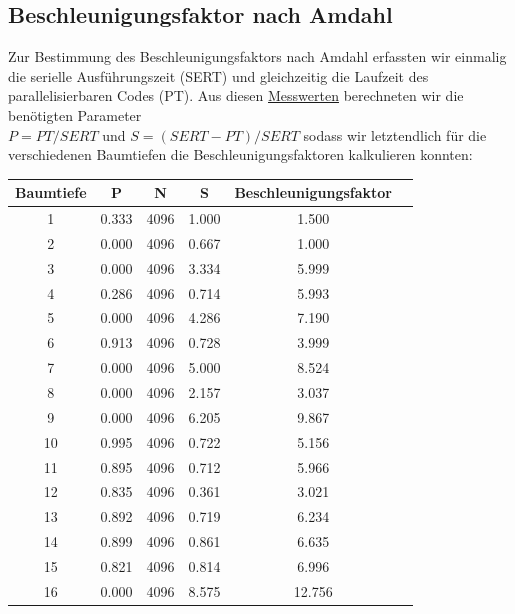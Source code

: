 \subsection{Beschleunigungsfaktor nach Amdahl}
\flushleft Zur Bestimmung des Beschleunigungsfaktors nach Amdahl erfassten wir einmalig die serielle Ausführungszeit (SERT) und 
gleichzeitig die Laufzeit des parallelisierbaren Codes (PT). Aus diesen \hyperref[Anhang]{Messwerten} berechneten wir die benötigten Parameter
\vspace{0.15cm}\\
\centering $P = PT / SERT$ und $S = (SERT - PT) / SERT$ 
\vspace{-0.15cm}
\flushleft sodass wir letztendlich für die verschiedenen Baumtiefen die Beschleunigungsfaktoren kalkulieren konnten:
\begin{table}[H]
    \centering
    \small
    \begin{tabular}{@{}cccccc@{}}
        \toprule
        Baumtiefe & P        & N    & S         & Beschleunigungsfaktor \\ \midrule
        1         & 0.333   & 4096 & 1.000     & 1.500 \\
        2         & 0.000   & 4096 & 0.667     & 1.000 \\
        3         & 0.000   & 4096 & 3.334     & 5.999 \\
        4         & 0.286   & 4096 & 0.714     & 5.993 \\
        5         & 0.000   & 4096 & 4.286     & 7.190 \\
        6         & 0.913   & 4096 & 0.728     & 3.999 \\
        7         & 0.000   & 4096 & 5.000     & 8.524 \\
        8         & 0.000   & 4096 & 2.157     & 3.037 \\
        9         & 0.000   & 4096 & 6.205     & 9.867 \\
        10        & 0.995   & 4096 & 0.722     & 5.156 \\
        11        & 0.895   & 4096 & 0.712     & 5.966 \\
        12        & 0.835   & 4096 & 0.361     & 3.021 \\
        13        & 0.892   & 4096 & 0.719     & 6.234 \\
        14        & 0.899   & 4096 & 0.861     & 6.635 \\
        15        & 0.821   & 4096 & 0.814     & 6.996 \\
        16        & 0.000   & 4096 & 8.575     & 12.756 \\

\end{tabular}
\end{table}

